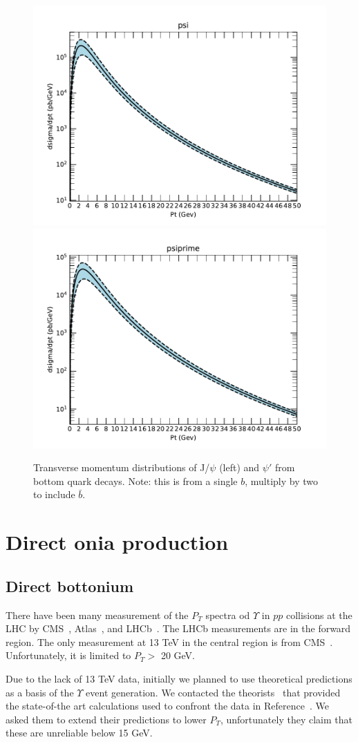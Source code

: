\documentclass[12pt]{article}
\begin{document}
\begin{figure}
  \includegraphics[width=0.48\linewidth]{../oniaFromB/psi.pdf}
  \includegraphics[width=0.48\linewidth]{../oniaFromB/psiprime.pdf}
  \caption{Transverse momentum distributions of J/$\psi$ (left) 
and $\psi'$ from bottom quark decays. Note: this is from a single $b$, 
multiply by two to include $\bar{b}$.}
  \label{fig:bpsi}
\end{figure}

\section{Direct onia production}
\label{sec:onia}

\subsection{Direct bottonium}
\label{sec:upsilon}

There have been many measurement of the $P_T$ spectra od $\Upsilon$ in $pp$ collisions
at the LHC by CMS~\cite{Khachatryan:2010zg, Chatrchyan:2013yna, Khachatryan:2015qpa, Sirunyan:2017qdw},
Atlas~\cite{Aad:2011xv, Aad:2012dlq},
  and LHCb~\cite{Aaij:2018pfp, Aaij:2015awa, Aaij:2014nwa, Aaij:2013yaa, LHCb:2012aa}.
  The LHCb measurements are in the forward region.  The only measurement at 13 TeV
  in the central region is from CMS~\cite{Sirunyan:2017qdw}.  Unfortunately, it is limited
  to $P_T >$ 20 GeV.

  Due to the lack of 13 TeV data, initially we planned to use theoretical predictions
  as a basis of the $\Upsilon$ event generation.
  We contacted the theorists~\cite{Han:2014kxa}
  that provided the state-of-the art calculations used to
  confront the data in Reference~\cite{Sirunyan:2017qdw}.  We
  asked them to extend their predictions to lower $P_T$, unfortunately they claim that these
  are unreliable below 15 GeV.
\end{document}
